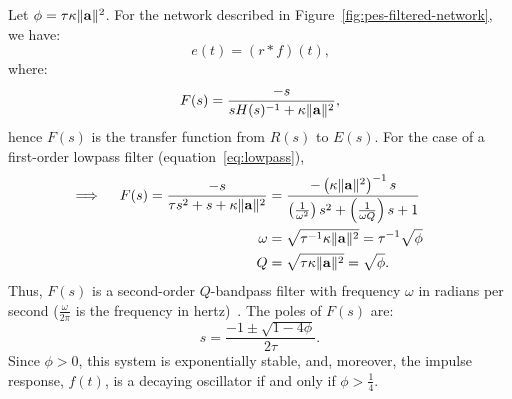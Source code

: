 \begin{theorem}
\label{thm:pes-filtered}
Let $\phi = \tau \kappa \|\mathbf{a}\|^2$.
For the network described in Figure~\ref{fig:pes-filtered-network}, we have:
\begin{equation}
\label{eq:time-domain}
e(t) = (r \ast f)(t) \text{,}
\end{equation}
where: %
\begin{equation}
\label{eq:s-domain}
F(s) = \frac{-s}{s H(s)^{-1} + \kappa \|\mathbf{a}\|^2} \text{,} 
\end{equation}
hence $F(s)$ is the transfer function from $R(s)$ to $E(s)$.
For the case of a first-order lowpass filter (equation~\ref{eq:lowpass}),
\begin{align}
\label{eq:lowpass-solution}
\implies \quad F(s) = \frac{-s}{\tau s^2 + s + \kappa \|\mathbf{a}\|^2} &= \frac{-\left( \kappa \|\mathbf{a}\|^2 \right)^{-1} s}{\left(\frac{1}{\omega^2}\right)s^2 + \left(\frac{1}{\omega Q}\right) s + 1} \quad\quad \\
\omega &= \sqrt{\tau^{-1} \kappa \|\mathbf{a}\|^2 } \label{eq:bandpass-w} = \tau^{-1} \sqrt{\phi} \\
Q &= \sqrt{\tau \kappa \|\mathbf{a}\|^2 } = \sqrt{\phi} \label{eq:bandpass-Q} \text{.}
\end{align}
Thus, $F(s)$ is a second-order $Q$-bandpass filter with frequency $\omega$ in radians per second ($\frac{\omega}{2 \pi}$ is the frequency in hertz)~\citep[][pp.~8.9--8.10]{zumbahlen2011linear}.
The poles of $F(s)$ are:
\begin{equation}
\label{eq:poles}
s = \frac{-1 \pm \sqrt{1 - 4 \phi}}{2\tau} \text{.}
\end{equation}
Since $\phi > 0$, this system is exponentially stable, and, moreover, the impulse response, $f(t)$, is a decaying oscillator if and only if $\phi > \frac{1}{4}$.
\end{theorem}

